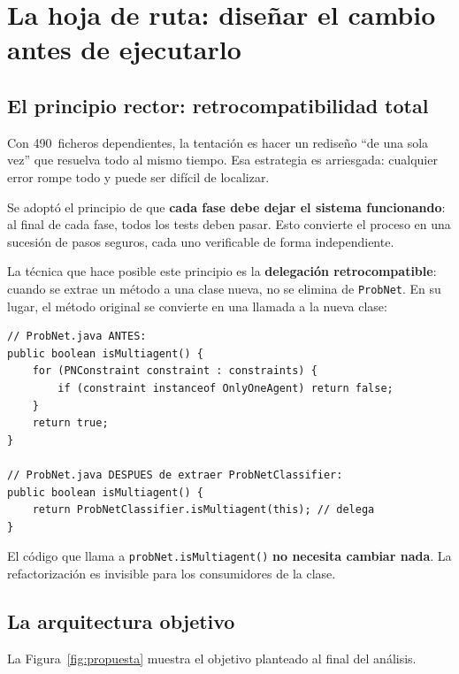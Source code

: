 \documentclass[11pt,a4paper]{article}
\newcommand{\code}[1]{\texttt{#1}}
\begin{document}
\section{La hoja de ruta: diseñar el cambio antes de ejecutarlo}
\label{sec:hoja-ruta}

\subsection{El principio rector: retrocompatibilidad total}

Con 490~ficheros dependientes, la tentación es hacer un rediseño ``de una
sola vez'' que resuelva todo al mismo tiempo.  Esa estrategia es
arriesgada: cualquier error rompe todo y puede ser difícil de localizar.

Se adoptó el principio de que \textbf{cada fase debe dejar el sistema
funcionando}: al final de cada fase, todos los tests deben pasar.  Esto
convierte el proceso en una sucesión de pasos seguros, cada uno
verificable de forma independiente.

La técnica que hace posible este principio es la
\textbf{delegación retrocompatible}: cuando se extrae un método a una
clase nueva, no se elimina de \code{ProbNet}.  En su lugar, el método
original se convierte en una llamada a la nueva clase:

\begin{lstlisting}[caption={Patrón de delegación retrocompatible.},
                   label=lst:retro]
// ProbNet.java ANTES:
public boolean isMultiagent() {
    for (PNConstraint constraint : constraints) {
        if (constraint instanceof OnlyOneAgent) return false;
    }
    return true;
}

// ProbNet.java DESPUES de extraer ProbNetClassifier:
public boolean isMultiagent() {
    return ProbNetClassifier.isMultiagent(this); // delega
}
\end{lstlisting}

El código que llama a \code{probNet.isMultiagent()} \textbf{no necesita
cambiar nada}.  La refactorización es invisible para los consumidores de
la clase.

\subsection{La arquitectura objetivo}

La Figura~\ref{fig:propuesta} muestra el objetivo planteado al final del
análisis.
\end{document}
